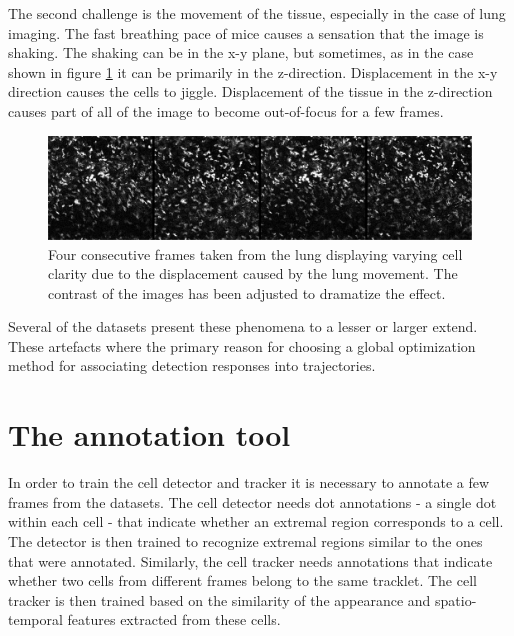 	The second challenge is the movement of the tissue, especially in the case of lung imaging. The fast breathing pace of mice causes a sensation that the image is shaking. The shaking can be in the x-y plane, but sometimes, as in the case shown in figure \cref{fig:data_challenges_movement} it can be primarily in the z-direction. Displacement in the x-y direction causes the cells to jiggle. Displacement of the tissue in the z-direction causes part of all of the image to become out-of-focus for a few frames.
	
	\begin{figure}[h]

		\includegraphics[width=\textwidth]{images/data_challenge_movement}

		\caption{Four consecutive frames taken from the lung displaying varying cell clarity due to the displacement caused by the lung movement. The contrast of the images has been adjusted to dramatize the effect.}
		\label{fig:data_challenges_movement}
	\end{figure}
	
	Several of the datasets present these phenomena to a lesser or larger extend. These artefacts where the primary reason for choosing a global optimization method for associating detection responses into trajectories.

    \section{The annotation tool \statusfirstdraft}
    \label{sec:data_tool}
    	In order to train the cell detector and tracker it is necessary to annotate a few frames from the datasets. The cell detector needs dot annotations - a single dot within each cell - that indicate whether an extremal region corresponds to a cell. The detector is then trained to recognize extremal regions similar to the ones that were annotated. Similarly, the cell tracker needs annotations that indicate whether two cells from different frames belong to the same tracklet. The cell tracker is then trained based on the similarity of the appearance and spatio-temporal features extracted from these cells.
    	

